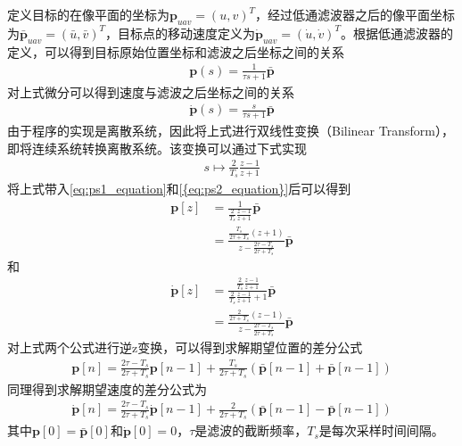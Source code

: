 定义目标的在像平面的坐标为$\mathbf{p}_{uav} = (u, v)^T$，经过低通滤波器之后的像平面坐标为$\bar{\mathbf{p}}_{uav} = (\bar{u}, \bar{v})^T$，目标点的移动速度定义为$\dot{\mathbf{p}}_{uav} = (\dot{u},\dot{v})^T$。根据低通滤波器的定义，可以得到目标原始位置坐标和滤波之后坐标之间的关系
\begin{align}
\label{eq:ps1_equation}
\mathbf{p}(s) = \frac{1}{\tau s+1}\bar{\mathbf{p}}
\end{align}
对上式微分可以得到速度与滤波之后坐标之间的关系
\begin{align}
\label{eq:ps2_equation}
\dot{\mathbf{p}}(s) = \frac{s}{\tau s+1}\bar{\mathbf{p}}
\end{align}
由于程序的实现是离散系统，因此将上式进行双线性变换（Bilinear Transform）\cite{franklin1998digital}，即将连续系统转换离散系统。该变换可以通过下式实现
\begin{align}
s \mapsto \frac{2}{T_s}\frac{z-1}{z+1}
\end{align}
将上式带入\ref{eq:ps1_equation}和\ref{{eq:ps2_equation}}后可以得到
\begin{align}
\mathbf{p}[z] &= \frac{1}{\frac{2}{T_s}\frac{z-1}{z+1}}\bar{\mathbf{p}} \\
&= \frac{\frac{T_s}{2\tau+T_s}(z+1)}{z-\frac{2\tau-T_s}{2\tau+T_s}}\bar{\mathbf{p}}
\end{align}
和
\begin{align}
\dot{\mathbf{p}}[z] &= \frac{\frac{2}{T_s}\frac{z-1}{z+1}}{\frac{2}{T_s}\frac{z-1}{z+1}+1}\bar{\mathbf{p}} \\
&= \frac{\frac{2}{2\tau+T_s}(z-1)}{z-\frac{2\tau-T_s}{2\tau+T_s}}\bar{\mathbf{p}}
\end{align}
对上式两个公式进行逆z变换，可以得到求解期望位置的差分公式
\begin{align}
\mathbf{p}[n] = \frac{2\tau-T_s}{2\tau+T_s} \mathbf{p}[n-1]+ \frac{T_s}{2\tau+T_s}(\bar{\mathbf{p}}[n-1] + \bar{\mathbf{p}}[n-1] )
\end{align}
同理得到求解期望速度的差分公式为
\begin{align}
\dot{\mathbf{p}}[n] = \frac{2\tau-T_s}{2\tau+T_s}\dot{\mathbf{p}}[n-1]+ \frac{2}{2\tau+T_s}(\bar{\mathbf{p}}[n-1] - \bar{\mathbf{p}}[n-1] )
\end{align}
其中$\mathbf{p}[0] = \bar{\mathbf{p}}[0]$和$\dot{\mathbf{p}}[0] = 0$，$\tau$是滤波的截断频率，$T_s$是每次采样时间间隔。


